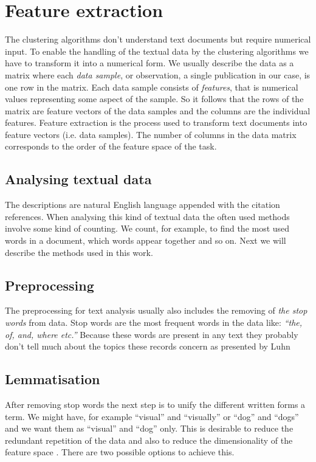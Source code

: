  
\section{Feature extraction}
The clustering algorithms don't understand text documents but 
require numerical input. To enable the handling of the textual 
data by the clustering algorithms we have to transform it into a
numerical form. We usually describe the data as a matrix where 
each \emph{data sample}, or observation, a single publication in 
our case, is one row in the matrix. Each data sample consists of
\emph{features}, that is numerical values representing some aspect
of the sample. So it follows that the rows of the matrix are 
feature vectors of the data samples and the columns are the 
individual features. Feature extraction is the process used to 
transform text documents into feature vectors (i.e. data samples).
The number of columns in the data matrix corresponds to the order 
of the feature space of the task.

\subsection{Analysing textual data}
The descriptions are natural English language appended with the 
citation references. When analysing 
this kind of textual data the often used methods involve some 
kind of counting. We count, for example, to find the most used 
words in a document, which words appear together and so on.
Next we will describe the methods used in this work.


\subsection{Preprocessing}
The preprocessing for text analysis usually also includes the 
removing of \emph{the stop words} from data. Stop words are the 
most frequent words in the data like: \emph{``the, of, and, where 
etc.''} Because these words are present in any text they probably 
don't tell much about the topics these records concern as 
presented by Luhn \cite{luhn_key_1960}


\subsection{Lemmatisation}
After removing stop words the next step is to unify the 
different written forms a term. We might have, for example 
``visual'' and ``visually'' or ``dog'' and ``dogs'' and we want 
them as ``visual'' and ``dog'' only. This is desirable to reduce 
the redundant repetition of the data and also to reduce the 
dimensionality of the feature space
\cite{siemens_lemmatization_1996}\cite{hann_towards_1975}.
There are two possible options to achieve this. 

